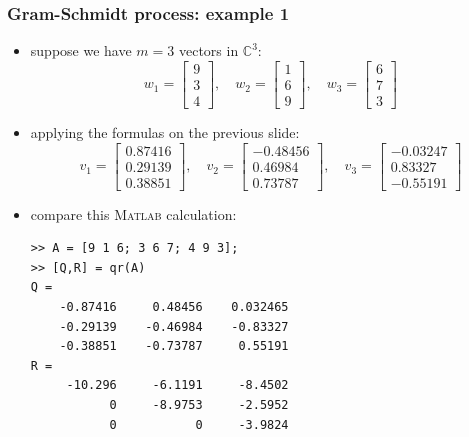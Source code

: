\documentclass[10pt,hyperref]{beamer}
\newcommand{\CC}{\mathbb{C}}
\newcommand{\Matlab}{\textsc{Matlab}\xspace}
\begin{document}
\begin{frame}[fragile]
\frametitle{Gram-Schmidt process: example 1}

\begin{itemize}
\item suppose we have $m=3$ vectors in $\CC^3$:
\small
    $$w_1 = \begin{bmatrix} 9 \\ 3 \\ 4 \end{bmatrix}, \quad w_2 = \begin{bmatrix} 1 \\ 6 \\ 9 \end{bmatrix}, \quad w_3 = \begin{bmatrix} 6 \\ 7 \\ 3 \end{bmatrix}$$
\normalsize
\item applying the formulas on the previous slide:
\small
    $$v_1 = \begin{bmatrix} 0.87416 \\ 0.29139 \\ 0.38851 \end{bmatrix}, \quad v_2 = \begin{bmatrix} -0.48456 \\ 0.46984 \\ 0.73787 \end{bmatrix}, \quad v_3 = \begin{bmatrix} -0.03247 \\ 0.83327 \\ -0.55191 \end{bmatrix}$$
\normalsize
\item compare this \Matlab calculation:
\begin{Verbatim}[fontsize=\scriptsize]
>> A = [9 1 6; 3 6 7; 4 9 3];
>> [Q,R] = qr(A)
Q =
    -0.87416     0.48456    0.032465
    -0.29139    -0.46984    -0.83327
    -0.38851    -0.73787     0.55191
R =
     -10.296     -6.1191     -8.4502
           0     -8.9753     -2.5952
           0           0     -3.9824
\end{Verbatim}
\end{itemize}
\end{frame}
\end{document}
